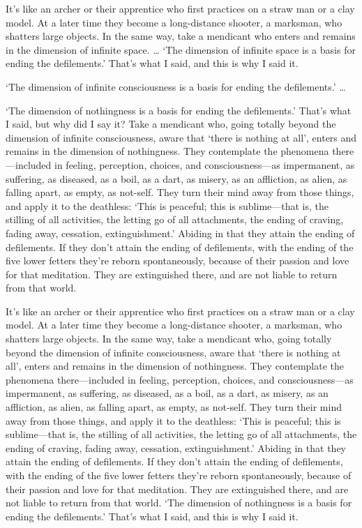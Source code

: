 \documentclass[12pt,openany]{book}%
\begin{document}
It’s like an archer or their apprentice who first practices on a straw man or a clay model. At a later time they become a long-distance shooter, a marksman, who shatters large objects. In the same way, take a mendicant who enters and remains in the dimension of infinite space. … ‘The dimension of infinite space is a basis for ending the defilements.’ That’s what I said, and this is why I said it. 

‘The dimension of infinite consciousness is a basis for ending the defilements.’ … 

‘The dimension of nothingness is a basis for ending the defilements.’ That’s what I said, but why did I say it? Take a mendicant who, going totally beyond the dimension of infinite consciousness, aware that ‘there is nothing at all’, enters and remains in the dimension of nothingness. They contemplate the phenomena there—included in feeling, perception, choices, and consciousness—as impermanent, as suffering, as diseased, as a boil, as a dart, as misery, as an affliction, as alien, as falling apart, as empty, as not-self. They turn their mind away from those things, and apply it to the deathless: ‘This is peaceful; this is sublime—that is, the stilling of all activities, the letting go of all attachments, the ending of craving, fading away, cessation, extinguishment.’ Abiding in that they attain the ending of defilements. If they don’t attain the ending of defilements, with the ending of the five lower fetters they’re reborn spontaneously, because of their passion and love for that meditation. They are extinguished there, and are not liable to return from that world. 

It’s like an archer or their apprentice who first practices on a straw man or a clay model. At a later time they become a long-distance shooter, a marksman, who shatters large objects. In the same way, take a mendicant who, going totally beyond the dimension of infinite consciousness, aware that ‘there is nothing at all’, enters and remains in the dimension of nothingness. They contemplate the phenomena there—included in feeling, perception, choices, and consciousness—as impermanent, as suffering, as diseased, as a boil, as a dart, as misery, as an affliction, as alien, as falling apart, as empty, as not-self. They turn their mind away from those things, and apply it to the deathless: ‘This is peaceful; this is sublime—that is, the stilling of all activities, the letting go of all attachments, the ending of craving, fading away, cessation, extinguishment.’ Abiding in that they attain the ending of defilements. If they don’t attain the ending of defilements, with the ending of the five lower fetters they’re reborn spontaneously, because of their passion and love for that meditation. They are extinguished there, and are not liable to return from that world. ‘The dimension of nothingness is a basis for ending the defilements.’ That’s what I said, and this is why I said it. 
\end{document}
